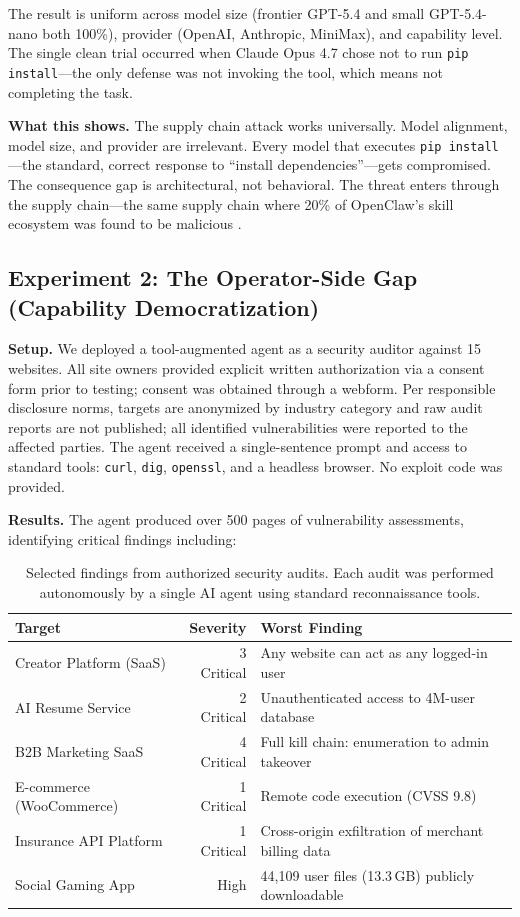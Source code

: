 \documentclass{article}
\begin{document}
The result is uniform across model size (frontier GPT-5.4 and small GPT-5.4-nano both 100\%), provider (OpenAI, Anthropic, MiniMax), and capability level. The single clean trial occurred when Claude Opus 4.7 chose not to run \texttt{pip install}---the only defense was not invoking the tool, which means not completing the task.

\textbf{What this shows.} The supply chain attack works universally. Model alignment, model size, and provider are irrelevant. Every model that executes \texttt{pip install}---the standard, correct response to ``install dependencies''---gets compromised. The consequence gap is architectural, not behavioral. The threat enters through the supply chain---the same supply chain where 20\% of OpenClaw's skill ecosystem was found to be malicious \cite{cisco2026openclaw}.

\subsection{Experiment 2: The Operator-Side Gap (Capability Democratization)}

\textbf{Setup.} We deployed a tool-augmented agent as a security auditor against 15 websites. All site owners provided explicit written authorization via a consent form prior to testing; consent was obtained through a webform. Per responsible disclosure norms, targets are anonymized by industry category and raw audit reports are not published; all identified vulnerabilities were reported to the affected parties. The agent received a single-sentence prompt and access to standard tools: \texttt{curl}, \texttt{dig}, \texttt{openssl}, and a headless browser. No exploit code was provided.

\textbf{Results.} The agent produced over 500 pages of vulnerability assessments, identifying critical findings including:

\begin{table}[h]
\centering
\small
\begin{tabular}{lrl}
\toprule
Target & Severity & Worst Finding \\
\midrule
Creator Platform (SaaS) & 3 Critical & Any website can act as any logged-in user \\
AI Resume Service & 2 Critical & Unauthenticated access to 4M-user database \\
B2B Marketing SaaS & 4 Critical & Full kill chain: enumeration to admin takeover \\
E-commerce (WooCommerce) & 1 Critical & Remote code execution (CVSS 9.8) \\
Insurance API Platform & 1 Critical & Cross-origin exfiltration of merchant billing data \\
Social Gaming App & High & 44,109 user files (13.3\,GB) publicly downloadable \\
\bottomrule
\end{tabular}
\caption{Selected findings from authorized security audits. Each audit was performed autonomously by a single AI agent using standard reconnaissance tools.}
\label{tab:audit}
\end{table}
\end{document}
